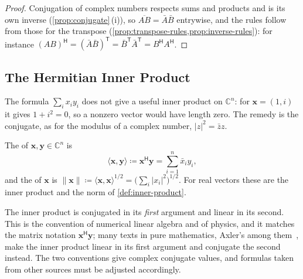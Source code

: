 \begin{proof}
Conjugation of complex numbers respects sums and products and is its own inverse (\cref{prop:conjugate}\,(i)), so $\overline{AB}=\bar A\bar B$ entrywise, and the rules follow from those for the transpose (\cref{prop:transpose-rules,prop:inverse-rules}): for instance $(AB)^{\mathsf H}=(\bar A\bar B)^{\mathsf T}=\bar B^{\mathsf T}\bar A^{\mathsf T}=B^{\mathsf H}A^{\mathsf H}$.
\end{proof}

\subsection{The Hermitian Inner Product}

The formula $\sum_ix_iy_i$ does not give a useful inner product on $\mathbb C^n$: for $\mathbf x=(1,i)$ it gives $1+i^2=0$, so a nonzero vector would have length zero. The remedy is the conjugate, as for the modulus of a complex number, $|z|^2=\bar zz$.

\begin{definition}
\label{def:hermitian-inner-product}
The  of $\mathbf x,\mathbf y\in\mathbb C^n$ is
\[
\langle\mathbf x,\mathbf y\rangle\coloneqq\mathbf x^{\mathsf H}\mathbf y=\sum_{i=1}^n\bar x_iy_i ,
\]
and the  of $\mathbf x$ is $\|\mathbf x\|\coloneqq\langle\mathbf x,\mathbf x\rangle^{1/2}=\bigl(\sum_i|x_i|^2\bigr)^{1/2}$. For real vectors these are the inner product and the norm of \cref{def:inner-product}.
\end{definition}

The inner product is conjugated in its \emph{first} argument and linear in its second. This is the convention of numerical linear algebra and of physics, and it matches the matrix notation $\mathbf x^{\mathsf H}\mathbf y$; many texts in pure mathematics, Axler's among them~\cite[Chap.~6]{axler2024}, make the inner product linear in its first argument and conjugate the second instead. The two conventions give complex conjugate values, and formulas taken from other sources must be adjusted accordingly.


